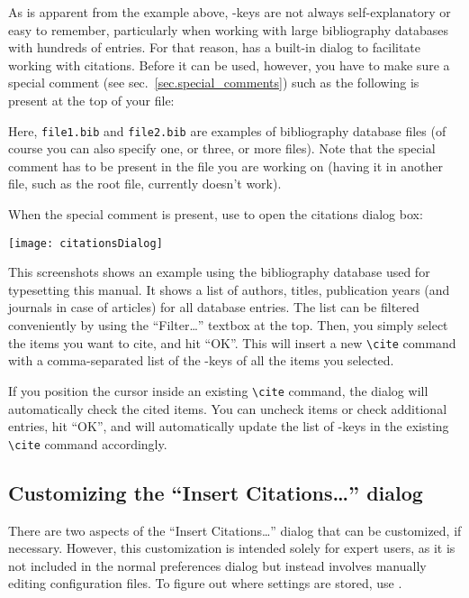 As is apparent from the example above, {\BibTeX}-keys are not always self-explanatory or easy to remember, particularly when working with large bibliography databases with hundreds of entries. For that reason, {\Tw} has a built-in dialog to facilitate working with citations. Before it can be used, however, you have to make sure a special comment (see sec.~\ref{sec.special_comments}) such as the following is present at the top of your file:
\begin{verbExample}
\end{verbExample}
Here, \verb|file1.bib| and \verb|file2.bib| are examples of bibliography database files (of course you can also specify one, or three, or more files). Note that the special comment has to be present in the file you are working on (having it in another file, such as the root file, currently doesn't work).

When the special comment is present, use \submenu{} to open the citations dialog box:
\begin{center}
\texttt{[image: citationsDialog]}
\end{center}

This screenshots shows an example using the bibliography database used for typesetting this manual. It shows a list of authors, titles, publication years (and journals in case of articles) for all database entries. The list can be filtered conveniently by using the ``Filter\dots'' textbox at the top. Then, you simply select the items you want to cite, and hit ``OK''. This will insert a new \verb|\cite| command with a comma-separated list of the {\BibTeX}-keys of all the items you selected.

If you position the cursor inside an existing \verb|\cite| command, the dialog will automatically check the cited items. You can uncheck items or check additional entries, hit ``OK'', and {\Tw} will automatically update the list of {\BibTeX}-keys in the existing \verb|\cite| command accordingly.

\subsection{Customizing the ``Insert Citations\dots'' dialog}
There are two aspects of the ``Insert Citations\dots'' dialog that can be customized, if necessary. However, this customization is intended solely for expert users, as it is not included in the normal preferences dialog but instead involves manually editing configuration files. To figure out where settings are stored, use \submenu{}.

